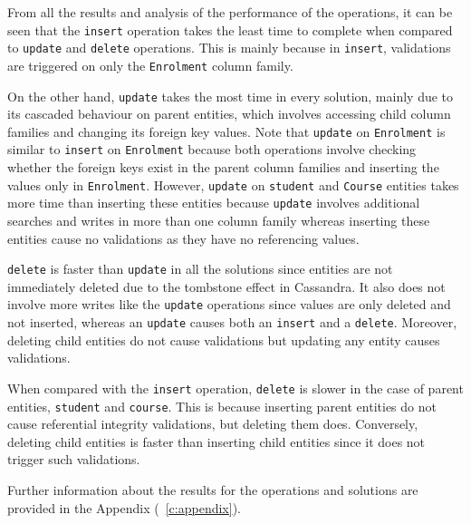  



From all the results and  analysis of the performance of the operations, it can
be seen that the \texttt{insert} operation takes the least time to complete when
compared to \texttt{update} and \texttt{delete} operations. This is mainly
because in \texttt{insert}, validations are triggered on only the
\texttt{Enrolment} column family.

On the other hand, \texttt{update} takes the most time  in every solution,
mainly due to its cascaded behaviour on parent entities, which involves
accessing child column families and changing its foreign key values.
Note that \texttt{update} on \texttt{Enrolment} is similar to \texttt{insert} on
\texttt{Enrolment} because both operations involve checking whether the foreign
keys exist in the parent column families and inserting the values only in
\texttt{Enrolment}.
However, \texttt{update} on \texttt{student} and  \texttt{Course} entities takes
more time than inserting these entities because \texttt{update} involves
additional searches and writes in more than one column family whereas inserting
these entities cause no validations as they have no referencing values.

\texttt{delete} is faster than \texttt{update} in all the solutions since
entities are not immediately deleted due to the tombstone effect in Cassandra.
It also does not involve more writes like the \texttt{update} operations since
values are only deleted and not inserted, whereas an \texttt{update} causes both
an \texttt{insert} and a \texttt{delete}. Moreover, deleting child entities do
not cause validations but updating any entity causes validations.

When compared with the \texttt{insert} operation, \texttt{delete} is slower in
the case of parent entities, \texttt{student} and \texttt{course}. This is 
because inserting parent entities do not cause referential integrity
validations, but deleting them does. Conversely, deleting child entities is
faster than inserting child entities since it does not trigger such validations.

Further information about the results for the operations and solutions are
provided in the Appendix (~\ref{c:appendix}).
